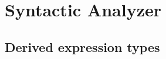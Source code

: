 \chapter{Syntactic Analyzer}
\label{syntactic-analyzer}

\section{Derived expression types}
\label{derivedsection}
